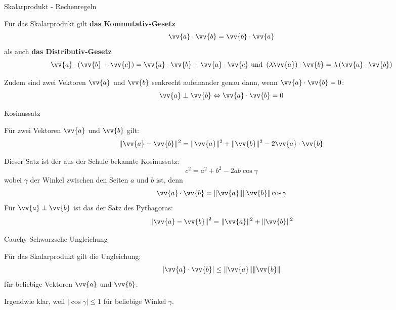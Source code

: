 \begin{frame}{Skalarprodukt - Rechenregeln}
	\begin{theorem}	
		Für das Skalarprodukt gilt \textbf{das Kommutativ-Gesetz}
		\[
			\vv{a} \cdot \vv{b} = \vv{b} \cdot \vv{a}
		\]
		als auch \textbf{das Distributiv-Gesetz}
		\[
			\vv{a} \cdot \left( \vv{b} + \vv{c} \right) = \vv{a} \cdot \vv{b} + \vv{a} \cdot \vv{c} \mbox{ und } \left( \lambda \vv{a} \right) \cdot \vv{b} = \lambda \left( \vv{a} \cdot \vv{b} \right)
 		\]
		
		Zudem sind zwei Vektoren $\vv{a}$ und $\vv{b}$ senkrecht aufeinander genau dann, wenn $\vv{a}\cdot\vv{b}=0$:
		\[
		\vv{a} \perp \vv{b} \Leftrightarrow \vv{a} \cdot \vv{b} = 0
		\]
	\end{theorem}	
\end{frame}

\begin{frame}{Kosinussatz}
	\begin{theorem}
		Für zwei Vektoren $\vv{a}$ und $\vv{b}$ gilt:
		\[
		\| \vv{a} - \vv{b}\|^2 = \|\vv{a}\|^2 + \|\vv{b}\|^2 - 2 \vv{a} \cdot \vv{b}
		\]
	\end{theorem}
	\begin{bemerkung}
		Dieser Satz ist der aus der Schule bekannte Kosinussatz:
		\[
			c^2 = a^2 + b^2 - 2 a b \cos \gamma
		\]
		wobei $\gamma$ der Winkel zwischen den Seiten $a$ und $b$ ist, denn
		\[
		\vv{a} \cdot \vv{b} = \| \vv{a} \| \| \vv{b} \| \cos \gamma
		\]
		Für $\vv{a} \perp \vv{b}$ ist das der Satz des Pythagoras:
		\[
			\left\| \vv{a} - \vv{b} \right\|^2 = \|\vv{a}\|^2 + \|\vv{b}\|^2
		\]
	\end{bemerkung}
\end{frame}

\begin{frame}{Cauchy-Schwarzsche Ungleichung}
	\begin{theorem}
		Für das Skalarprodukt gilt die Ungleichung:
		\[
			| \vv{a} \cdot \vv{b} | \leq \|\vv{a}\| \|\vv{b}\|
		\]
		für beliebige Vektoren $\vv{a}$ und $\vv{b}$.
	\end{theorem}
	Irgendwie klar, weil $|\cos \gamma| \leq 1$ für beliebige Winkel $\gamma$.
\end{frame}

